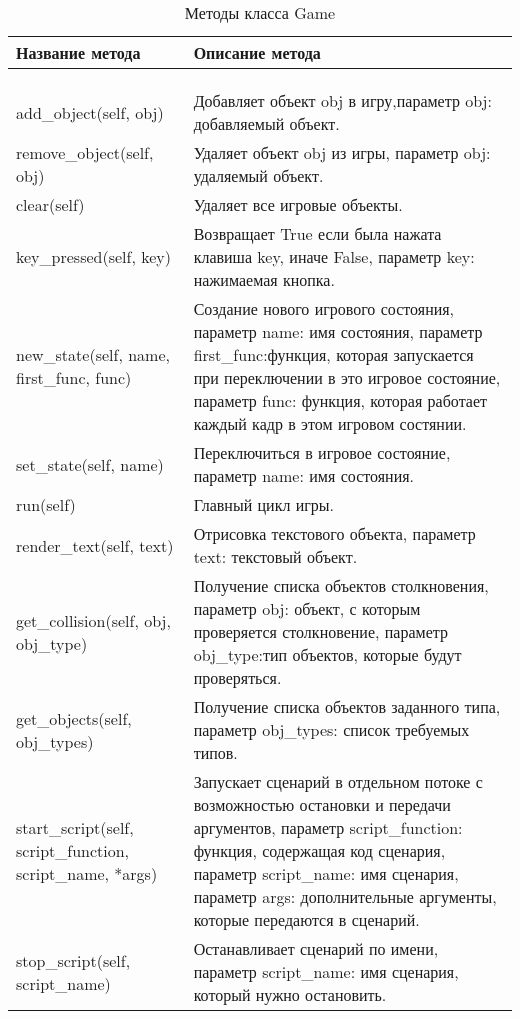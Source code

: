 \begin{xltabular}{\textwidth}{|X|X|}
	\caption{Методы класса Game}\label{table:game_methods} \\
	\hline \centrow
	Название метода & \centrow  Описание метода \\
	\hline {} &  \\ \hline
	\endfirsthead
	\\
	\hline {} &  \\ \hline
	\finishhead
	add\_object(self, obj) & Добавляет объект obj в игру,параметр obj: добавляемый объект. \\
	\hline
	remove\_object(self, obj) & Удаляет объект obj из игры, параметр obj: удаляемый объект. \\
	\hline
	clear(self) & Удаляет все игровые объекты. \\
	\hline
	key\_pressed(self, key) & Возвращает True если была нажата клавиша key, иначе False, параметр key: нажимаемая кнопка. \\
	\hline
	new\_state(self, name, first\_func, func) & Создание нового игрового состояния, параметр name: имя состояния, параметр first\_func:функция, которая запускается при переключении в это игровое состояние, параметр func: функция, которая работает каждый кадр в этом игровом состянии. \\
	\hline
	set\_state(self, name) & Переключиться в игровое состояние, параметр name: имя состояния. \\
	\hline
	run(self) & Главный цикл игры. \\
	\hline
	render\_text(self, text) & Отрисовка текстового объекта, параметр text: текстовый объект. \\
	\hline
	get\_collision(self, obj, obj\_type) & Получение списка объектов столкновения, параметр obj: объект, с которым проверяется столкновение, параметр obj\_type:тип объектов, которые будут проверяться. \\
	\hline
	get\_objects(self, obj\_types) & Получение списка объектов заданного типа, параметр obj\_types: список требуемых типов. \\
	\hline
	start\_script(self, script\_function, script\_name, *args) & Запускает сценарий в отдельном потоке с возможностью остановки и передачи аргументов, параметр script\_function: функция, содержащая код сценария, параметр script\_name: имя сценария, параметр args: дополнительные аргументы, которые передаются в сценарий. \\
	\hline
	stop\_script(self, script\_name) & Останавливает сценарий по имени, параметр script\_name: имя сценария, который нужно остановить. \\
	\hline
\end{xltabular}

